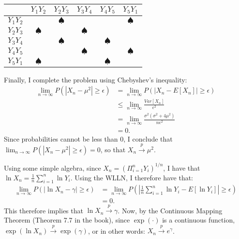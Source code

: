\begin{problem}{15}
\begin{center}
\bgroup
\def\arraystretch{2.2}
  \begin{tabular}{ | c | c | c | c | c | c |}
    \hline
     & $Y_1Y_2$ & $Y_2Y_3$& $Y_3Y_4$& $Y_4Y_5$& $Y_5Y_1$ \\  \hline
    $Y_1Y_2$ &\cellcolor{light-gray} &$\spadesuit$ & & &$\spadesuit$ \\ \hline
    $Y_2Y_3$ &$\spadesuit$ &\cellcolor{light-gray} &$\spadesuit$ && \\ \hline
    $Y_3Y_4$ & & $\spadesuit$&\cellcolor{light-gray} & $\spadesuit$ & \\ \hline
     $Y_4Y_5$ & & & $\spadesuit$&\cellcolor{light-gray} & $\spadesuit$\\ \hline
     $Y_5Y_1$ & $\spadesuit$& & &$\spadesuit$ &\cellcolor{light-gray} \\
    \hline
  \end{tabular}
  \egroup
\end{center}

Finally, I complete the problem using Chebyshev's inequality:
\begin{align*}
\lim_{n \rightarrow \infty}P(|X_n-\mu^2| \ge \epsilon) & = \lim_{n \rightarrow \infty}P(|X_n-E[X_n]| \ge \epsilon) \\
& \le \lim_{n \rightarrow \infty} \frac{Var[X_n]}{\epsilon^2} \\
& = \lim_{n \rightarrow \infty}\frac{\sigma^2 (\sigma^2+4 \mu^2)}{n \epsilon^2} \\
& = 0.
\end{align*}
Since probabilities cannot be less than 0, I conclude that $\lim_{n \rightarrow \infty}P(|X_n-\mu^2| \ge \epsilon)=0$, so that $X_{n} \xrightarrow{p} \mu^2$.
 
 \end{problem}
 
 \begin{problem}{16}  Using some simple algebra, since $X_n =\left( \Pi_{i=1}^nY_i \right)^{1/n}$, I have that $\ln X_n = \frac{1}{n} \sum_{i=1}^n\ln Y_i$.  Using the WLLN, I therefore have that:
 \begin{align*}
 \lim_{n \rightarrow \infty} P(|\ln X_n -\gamma | \ge \epsilon) & =  \lim_{n \rightarrow \infty} P\left(\left | \frac{1}{n} \sum_{i=1}^n\ln Y_i -E[\ln Y_i]\right | \ge \epsilon\right) \\
 & = 0.
 \end{align*}
 This therefore implies that $\ln X_{n} \xrightarrow{p} \gamma$.  Now, by the Continuous Mapping Theorem (Theorem 7.7 in the book), since $\exp(\cdot)$ is a continuous function, $\exp(\ln X_{n}) \xrightarrow{p} \exp(\gamma)$, or in other words: $X_{n} \xrightarrow{p} e^{\gamma}$.
 \end{problem}


